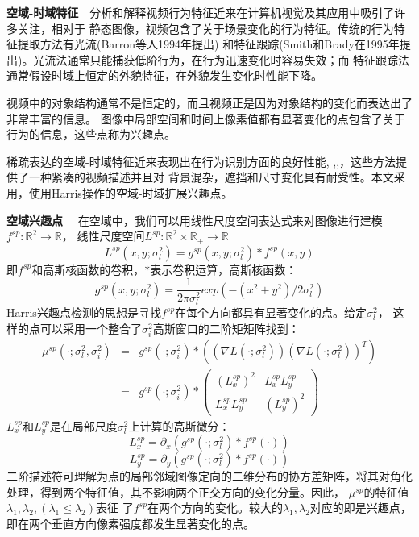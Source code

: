 \textbf{空域-时域特征}~~分析和解释视频行为特征近来在计算机视觉及其应用中吸引了许多关注，相对于
静态图像，视频包含了关于场景变化的行为特征。传统的行为特征提取方法有光流(Barron等人1994年提出)
和特征跟踪(Smith和Brady在1995年提出)。光流法通常只能捕获低阶行为，在行为迅速变化时容易失效；而
特征跟踪法通常假设时域上恒定的外貌特征，在外貌发生变化时性能下降。

视频中的对象结构通常不是恒定的，而且视频正是因为对象结构的变化而表达出了非常丰富的信息。
图像中局部空间和时间上像素值都有显著变化的点包含了关于行为的信息，这些点称为兴趣点。

稀疏表达的空域-时域特征近来表现出在行为识别方面的良好性能\cite{sstf},
\cite{orcc},\cite{objectrepresent},\cite{webimage}，这些方法提供了一种紧凑的视频描述并且对
背景混杂，遮挡和尺寸变化具有耐受性。本文采用\cite{ostip}，使用Harris操作的空域-时域扩展兴趣点。


\textbf{空域兴趣点}~~
在空域中，我们可以用线性尺度空间表达式来对图像进行建模$f^{sp}:\mathbb{R}^2\to\mathbb{R}$，
线性尺度空间$L^{sp}:\mathbb{R}^2\times\mathbb{R}_+\to\mathbb{R}$
\begin{equation}
    L^{sp}(x,y;\sigma^2_l)=g^{sp}(x,y;\sigma_l^2)*f^{sp}(x,y)
\end{equation}
即$f^{sp}$和高斯核函数的卷积，$*$表示卷积运算，高斯核函数：
\begin{equation}
    g^{sp}(x,y;\sigma_l^2)=\frac{1}{2\pi\sigma_l^2}exp(-(x^2+y^2)/2\sigma_l^2)
\end{equation}
Harris兴趣点检测的思想是寻找$f^{sp}$在每个方向都具有显著变化的点。给定$\sigma_l^2$，
这样的点可以采用一个整合了$\sigma_i^2$高斯窗口的二阶矩矩阵找到：
\begin{eqnarray}
    \mu^{sp}(\cdot;\sigma_l^2,\sigma_i^2)&=&g^{sp}(\cdot;\sigma_i^2)*
    ((\nabla{}L(\cdot;\sigma_l^2))(\nabla{}L(\cdot;\sigma_l^2))^T)\\
    {}&=&g^{sp}(\cdot;\sigma_i^2)*\left(\begin{array}{cc}
    (L_x^{sp})^2&L_x^{sp}L_y^{sp}\\
    L_x^{sp}L_y^{sp}&(L_y^{sp})^2
\end{array}\right)
\end{eqnarray}
$L_x^{sp}$和$L_y^{sp}$是在局部尺度$\sigma_l^2$上计算的高斯微分：
\begin{equation}
    L_x^{sp}=\partial_x(g^{sp}(\cdot;\sigma_l^2)*f^{sp}(\cdot))
\end{equation}
\begin{equation}
    L_y^{sp}=\partial_y(g^{sp}(\cdot;\sigma_l^2)*f^{sp}(\cdot))
\end{equation}
二阶描述符可理解为点的局部邻域图像定向的二维分布的协方差矩阵，将其对角化
处理，得到两个特征值，其不影响两个正交方向的变化分量。因此，
$\mu^{sp}$的特征值$\lambda_1,\lambda_2,(\lambda_1\leq\lambda_2)$表征
了$f^{sp}$在两个方向的变化。较大的$\lambda_1,\lambda_2$对应的即是兴趣点，
即在两个垂直方向像素强度都发生显著变化的点。

